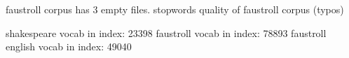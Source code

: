 \documentclass[11pt]{thesis} %
\begin{document}








faustroll corpus has 3 empty files.
stopwords
quality of faustroll corpus (typos)


shakespeare vocab in index: 23398
faustroll vocab in index: 78893
faustroll english vocab in index: 49040
\end{document}
